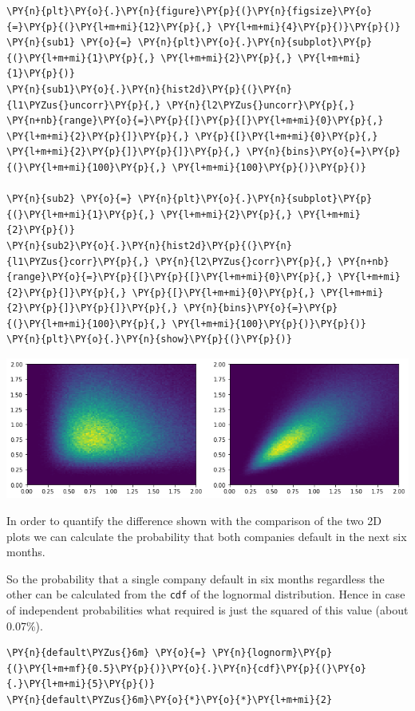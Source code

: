 \begin{Answer}
\begin{codebox}[size=fbox, boxrule=1pt, colback=cellbackground, colframe=cellborder]
\begin{Verbatim}[commandchars=\\\{\}]
\PY{n}{plt}\PY{o}{.}\PY{n}{figure}\PY{p}{(}\PY{n}{figsize}\PY{o}{=}\PY{p}{(}\PY{l+m+mi}{12}\PY{p}{,} \PY{l+m+mi}{4}\PY{p}{)}\PY{p}{)}
\PY{n}{sub1} \PY{o}{=} \PY{n}{plt}\PY{o}{.}\PY{n}{subplot}\PY{p}{(}\PY{l+m+mi}{1}\PY{p}{,} \PY{l+m+mi}{2}\PY{p}{,} \PY{l+m+mi}{1}\PY{p}{)}
\PY{n}{sub1}\PY{o}{.}\PY{n}{hist2d}\PY{p}{(}\PY{n}{l1\PYZus{}uncorr}\PY{p}{,} \PY{n}{l2\PYZus{}uncorr}\PY{p}{,} \PY{n+nb}{range}\PY{o}{=}\PY{p}{[}\PY{p}{[}\PY{l+m+mi}{0}\PY{p}{,} \PY{l+m+mi}{2}\PY{p}{]}\PY{p}{,} \PY{p}{[}\PY{l+m+mi}{0}\PY{p}{,} \PY{l+m+mi}{2}\PY{p}{]}\PY{p}{]}\PY{p}{,} \PY{n}{bins}\PY{o}{=}\PY{p}{(}\PY{l+m+mi}{100}\PY{p}{,} \PY{l+m+mi}{100}\PY{p}{)}\PY{p}{)}
		
\PY{n}{sub2} \PY{o}{=} \PY{n}{plt}\PY{o}{.}\PY{n}{subplot}\PY{p}{(}\PY{l+m+mi}{1}\PY{p}{,} \PY{l+m+mi}{2}\PY{p}{,} \PY{l+m+mi}{2}\PY{p}{)}
\PY{n}{sub2}\PY{o}{.}\PY{n}{hist2d}\PY{p}{(}\PY{n}{l1\PYZus{}corr}\PY{p}{,} \PY{n}{l2\PYZus{}corr}\PY{p}{,} \PY{n+nb}{range}\PY{o}{=}\PY{p}{[}\PY{p}{[}\PY{l+m+mi}{0}\PY{p}{,} \PY{l+m+mi}{2}\PY{p}{]}\PY{p}{,} \PY{p}{[}\PY{l+m+mi}{0}\PY{p}{,} \PY{l+m+mi}{2}\PY{p}{]}\PY{p}{]}\PY{p}{,} \PY{n}{bins}\PY{o}{=}\PY{p}{(}\PY{l+m+mi}{100}\PY{p}{,} \PY{l+m+mi}{100}\PY{p}{)}\PY{p}{)}
\PY{n}{plt}\PY{o}{.}\PY{n}{show}\PY{p}{(}\PY{p}{)}
\end{Verbatim}
\end{codebox}

\begin{center}
	\includegraphics{figures/copula_lognormal.png}
\end{center}

In order to quantify the difference shown with the comparison of the two 2D plots we can calculate the probability that both companies default in the next six months.

So the probability that a single company default in six months regardless the other can be calculated from the \texttt{cdf} of the lognormal distribution.
Hence in case of independent probabilities what required is just the squared of this value
(about 0.07\%).
\begin{codebox}[size=fbox, boxrule=1pt, colback=cellbackground, colframe=cellborder]
\begin{Verbatim}[commandchars=\\\{\}]
\PY{n}{default\PYZus{}6m} \PY{o}{=} \PY{n}{lognorm}\PY{p}{(}\PY{l+m+mf}{0.5}\PY{p}{)}\PY{o}{.}\PY{n}{cdf}\PY{p}{(}\PY{o}{.}\PY{l+m+mi}{5}\PY{p}{)}
\PY{n}{default\PYZus{}6m}\PY{o}{*}\PY{o}{*}\PY{l+m+mi}{2}


\end{Verbatim}
\end{codebox}
\end{Answer}
